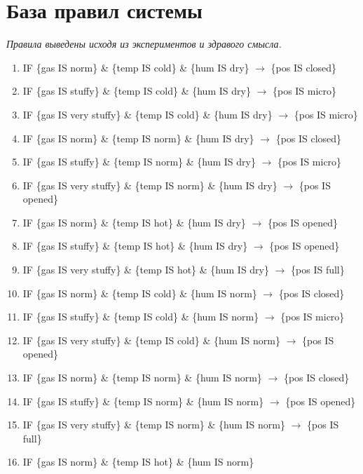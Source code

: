 \documentclass[a4paper]{article}
\begin{document}
\section{База правил системы}
{\itshape Правила выведены исходя из экспериментов и здравого смысла.}
\begin{enumerate}
    \item IF \{gas IS norm\} \& \{temp IS cold\} \& \{hum IS dry\} 
        $\rightarrow$ \{pos IS closed\}
    \item IF \{gas IS stuffy\} \& \{temp IS cold\} \& \{hum IS dry\} 
        $\rightarrow$ \{pos IS micro\}
    \item IF \{gas IS very stuffy\} \& \{temp IS cold\} \& \{hum IS dry\} 
    	$\rightarrow$ \{pos IS micro\}
    \item IF \{gas IS norm\} \& \{temp IS norm\} \& \{hum IS dry\} 
    	$\rightarrow$ \{pos IS closed\}
    \item IF \{gas IS stuffy\} \& \{temp IS norm\} \& \{hum IS dry\} 
    	$\rightarrow$ \{pos IS micro\}
    \item IF \{gas IS very stuffy\} \& \{temp IS norm\} \& \{hum IS dry\} 
    	$\rightarrow$ \{pos IS opened\}
    \item IF \{gas IS norm\} \& \{temp IS hot\} \& \{hum IS dry\} 
    	$\rightarrow$ \{pos IS opened\}
    \item IF \{gas IS stuffy\} \& \{temp IS hot\} \& \{hum IS dry\} 
    	$\rightarrow$ \{pos IS opened\}
    \item IF \{gas IS very stuffy\} \& \{temp IS hot\} \& \{hum IS dry\} 
    	$\rightarrow$ \{pos IS full\}
    \item IF \{gas IS norm\} \& \{temp IS cold\} \& \{hum IS norm\} 
    	$\rightarrow$ \{pos IS closed\}
    \item IF \{gas IS stuffy\} \& \{temp IS cold\} \& \{hum IS norm\} 
    	$\rightarrow$ \{pos IS micro\}
    \item IF \{gas IS very stuffy\} \& \{temp IS cold\} \& \{hum IS norm\} 
    	$\rightarrow$ \{pos IS opened\}
    \item IF \{gas IS norm\} \& \{temp IS norm\} \& \{hum IS norm\} 
    	$\rightarrow$ \{pos IS closed\}
    \item IF \{gas IS stuffy\} \& \{temp IS norm\} \& \{hum IS norm\} 
    	$\rightarrow$ \{pos IS opened\}
    \item IF \{gas IS very stuffy\} \& \{temp IS norm\} \& \{hum IS norm\} 
    	$\rightarrow$ \{pos IS full\}
    \item IF \{gas IS norm\} \& \{temp IS hot\} \& \{hum IS norm\} 

\end{enumerate}
\end{document}
